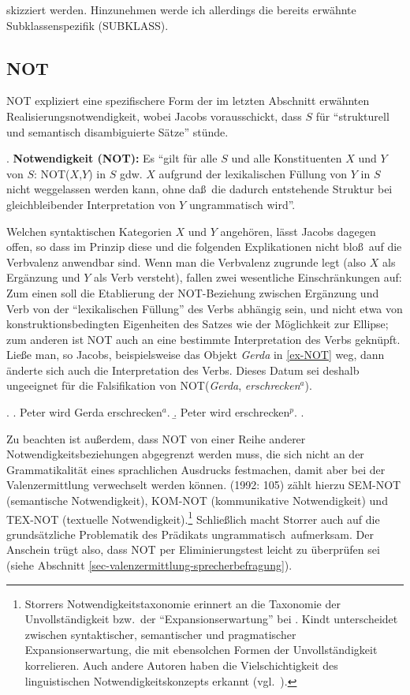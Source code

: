 \citet[Kapitel~4]{Jacobs:94} skizziert werden. Hinzunehmen werde ich allerdings die bereits erwähnte Subklassenspezifik (SUBKLASS).

\subsection{NOT}

NOT expliziert eine spezifischere Form der im letzten Abschnitt erwähnten Realisierungsnotwendigkeit, wobei Jacobs vorausschickt, dass $S$ für "`strukturell und semantisch disambiguierte Sätze"' stünde.

\ex. {\bf Notwendigkeit (NOT):} Es "`gilt für alle $S$ und alle Konstituenten $X$ und $Y$ von $S$: NOT($X$,$Y$) in $S$ gdw. $X$ aufgrund der lexikalischen Füllung von $Y$ in $S$ nicht weggelassen werden kann, ohne da\ss \ die dadurch entstehende Struktur bei gleichbleibender Interpretation von $Y$ ungrammatisch wird"'. \citep[14]{Jacobs:94}  

Welchen syntaktischen Kategorien $X$ und $Y$ angehören, lässt Jacobs dagegen offen, so dass im Prinzip diese und die folgenden Explikationen nicht blo\ss \ auf die Verbvalenz anwendbar sind. Wenn man die Verbvalenz zugrunde legt (also $X$ als Ergänzung und $Y$ als Verb versteht), fallen zwei wesentliche Einschränkungen auf: Zum einen soll die Etablierung der NOT-Bezie\-hung zwischen Ergänzung und Verb von der "`lexikalischen Füllung"' des Verbs abhängig sein, und nicht etwa von konstruktionsbedingten Eigenheiten des Satzes wie der Möglichkeit zur Ellipse; zum anderen ist NOT auch an eine bestimmte Interpretation des Verbs geknüpft. Lie\ss e man, so Jacobs, beispielsweise das Objekt {\it Gerda} in \ref{ex-NOT} weg, dann änderte sich auch die Interpretation des Verbs. Dieses Datum sei deshalb ungeeignet für die Falsifikation von NOT({\it Gerda}, {\it erschrecken$^a$}).

\ex. \label{ex-NOT}
\a. Peter wird Gerda erschrecken$^a$.
\b. Peter wird erschrecken$^p$.
\z. \citep[14f]{Jacobs:94}

Zu beachten ist au\ss erdem, dass NOT von einer Reihe anderer Notwendigkeitsbeziehungen abgegrenzt werden muss, die sich nicht an der Grammatikalität eines sprachlichen Ausdrucks festmachen, damit aber bei der Valenzermittlung verwechselt werden können. \citeauthor{Storrer:92} (1992: 105) zählt hierzu SEM-NOT (semantische Notwendigkeit), KOM-NOT (kommunikative Notwendigkeit) und TEX-NOT (textuelle Notwendigkeit).\footnote{Storrers Notwendigkeitstaxonomie erinnert an die Taxonomie der Unvollständigkeit bzw.\ der "`Expansionserwartung"' bei \cite{Kindt:85}. Kindt unterscheidet zwischen syntaktischer, semantischer und pragmatischer Expansionserwartung, die mit ebensolchen Formen der Unvollständigkeit korrelieren. Auch andere Autoren haben die Vielschichtigkeit des linguistischen Notwendigkeitskonzepts erkannt (vgl.\ \citealt[226]{Vater:81}).} Schlie\ss lich macht Storrer auch auf die grundsätzliche Problematik des Prädikats \glq ungrammatisch\grq\ aufmerksam. Der Anschein trügt also, dass NOT per Eliminierungstest leicht zu überprüfen sei (siehe Abschnitt \ref{sec-valenzermittlung-sprecherbefragung}).

